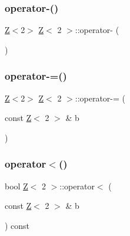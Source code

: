\subsubsection{\texorpdfstring{operator-\/()}{operator-()}\hspace{0.1cm}{\footnotesize\ttfamily [2/2]}}
{\footnotesize\ttfamily \hyperlink{classZ}{Z}$<$2$>$ \hyperlink{classZ}{Z}$<$ 2 $>$\+::operator-\/ (\begin{DoxyParamCaption}{ }\end{DoxyParamCaption})\hspace{0.3cm}{\ttfamily [inline]}}

\mbox{\label{classZ_3_012_01_4_aac3bc93e616ba069f99e794dad872799}} 
\subsubsection{\texorpdfstring{operator-\/=()}{operator-=()}}
{\footnotesize\ttfamily \hyperlink{classZ}{Z}$<$2$>$ \hyperlink{classZ}{Z}$<$ 2 $>$\+::operator-\/= (\begin{DoxyParamCaption}\item[{const \hyperlink{classZ}{Z}$<$ 2 $>$ \&}]{b }\end{DoxyParamCaption})\hspace{0.3cm}{\ttfamily [inline]}}

\mbox{\label{classZ_3_012_01_4_aec8e51a2935d539f11220270f35c1c31}} 
\subsubsection{\texorpdfstring{operator$<$()}{operator<()}}
{\footnotesize\ttfamily bool \hyperlink{classZ}{Z}$<$ 2 $>$\+::operator$<$ (\begin{DoxyParamCaption}\item[{const \hyperlink{classZ}{Z}$<$ 2 $>$ \&}]{b }\end{DoxyParamCaption}) const\hspace{0.3cm}{\ttfamily [inline]}}

\mbox{\label{classZ_3_012_01_4_a6e1b77419935d4f017ffab84df3ca520}} 
